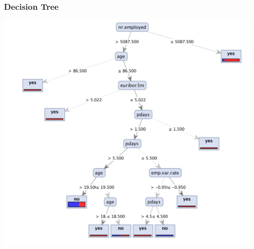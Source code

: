 \documentclass{beamer}
\begin{document}
\begin{frame}
	\frametitle{Decision Tree}
  \includegraphics[width=\textwidth,height=\textheight,keepaspectratio]{dt-ra-s-tree}
\end{frame}
\end{document}
